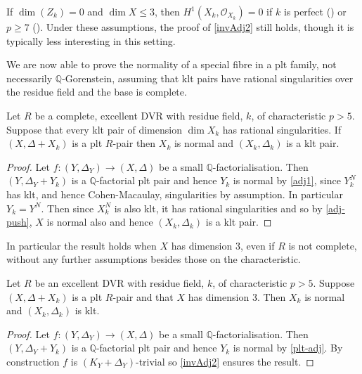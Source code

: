 \begin{remark}
	If $\dim(Z_k)=0$ and $\dim X \leq 3$, then $H^1(X_k, \mathcal{O}_{X_k})=0$ if $k$ is perfect (\cite[Proposition 2.20]{NT20}) or $p \geq 7$ (\cite[Theorem 5.7]{BT22}). Under these assumptions, the proof of \autoref{invAdj2} still holds, though it is typically less interesting in this setting.
\end{remark}

We are now able to prove the normality of a special fibre in a plt family, not necessarily $\mathbb{Q}$-Gorenstein, assuming that klt pairs have rational singularities over the residue field and the base is complete.

\begin{theorem}\label{NormalToRational}
	Let $R$ be a complete, excellent DVR with residue field, $k$, of characteristic $p> 5$. Suppose that every klt pair of dimension $\dim X_{k}$ has rational singularities. If $(X,\Delta+X_{k})$ is a plt $R$-pair then $X_{k}$ is normal and $(X_{k}, \Delta_{k})$ is a klt pair.
\end{theorem}

\begin{proof}
	
	Let $f\colon (Y,\Delta_{Y})\to (X,\Delta)$ be a small $\mathbb{Q}$-factorialisation. Then $(Y,\Delta_{Y}+Y_{k})$ is a $\mathbb{Q}$-factorial plt pair and hence $Y_{k}$ is normal by \autoref{adj1}, since $Y_{k}^{N}$ has klt, and hence Cohen-Macaulay, singularities by assumption. In particular $Y_{k}=Y^{N}$. Then since $X_{k}^{N}$ is also klt, it has rational singularities and so by \autoref{adj-push}, $X$ is normal also and hence $(X_{k},\Delta_{k})$ is a klt pair.
	
\end{proof}

In particular the result holds when $X$ has dimension $3$, even if $R$ is not complete, without any further assumptions besides those on the characteristic.
 
\begin{corollary}\label{invAdj3}
	Let $R$ be an excellent DVR with residue field, $k$, of characteristic $p> 5$. Suppose $(X,\Delta+X_{k})$ is a plt $R$-pair and that $X$ has dimension $3$. Then $X_{k}$ is normal and $(X_{k}, \Delta_{k})$ is klt.
\end{corollary}

\begin{proof}
	Let $f\colon (Y,\Delta_{Y})\to (X,\Delta)$ be a small $\mathbb{Q}$-factorialisation. Then $(Y,\Delta_{Y}+Y_{k})$ is a $\mathbb{Q}$-factorial plt pair and hence $Y_{k}$ is normal by \autoref{plt-adj}. 
	By construction $f$ is $(K_{Y}+\Delta_{Y})$-trivial so \autoref{invAdj2} ensures the result.
\end{proof}

